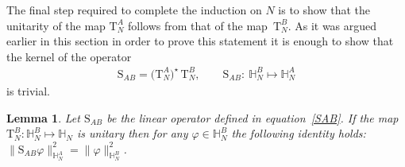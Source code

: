 \documentclass[pdftex]{sigma}%
\numberwithin{equation}{section}
\newtheorem{Lemma}[Theorem]{Lemma}
\begin{document}
The final step required to complete the induction on $N$ is to show that the unitarity of the map $\mathrm T_N^A$ follows from that
of the map~$\mathrm T_N^B$. As it was argued earlier in this section in order to prove this statement it is enough to show that the kernel of the operator
\begin{gather}\label{SAB}
\mathrm S_{AB}=\big(\mathrm T_N^A\big)^{\star} \,\mathrm T_N^B, \qquad
\mathrm S_{AB}\colon\ \mathbb H_N^B\mapsto \mathbb H_N^A
\end{gather}
is trivial.

\begin{Lemma}
Let $\mathrm S_{AB}$ be the linear operator defined in equation~\eqref{SAB}. If the map $\mathrm T_N^B\colon \mathbb H_N^{B}\mapsto \mathbb H_N$
is unitary then for any $\varphi\in \mathbb H_N^B$ the following identity holds: $\|\mathrm S_{AB}\varphi\|^2_{\mathbb
H_N^{A}}=\|\varphi\|^2_{\mathbb H_N^B}$.
\label{Lemme isometrie operateur SAB}
\end{Lemma}
\end{document}
